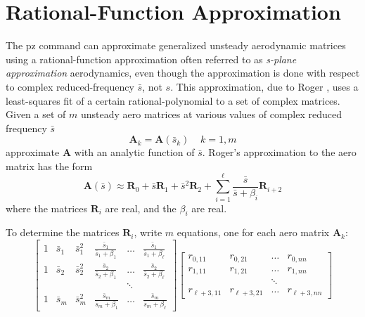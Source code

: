 \documentclass[11pt,openany,twoside]{book}
\numberwithin{equation}{section}		%
\newcommand{\Cmd}[1]{{\sf #1}}
\newcommand{\Newterm}[1]{{\em #1}}	%
\newcommand{\Matrix}[1]{\boldsymbol{#1}}
\begin{document}
\section{Rational-Function Approximation}\label{sect:rfa-theory}
\par
{}
The \Cmd{pz} command can approximate generalized
unsteady aerodynamic matrices using a rational-function
approximation often referred to as \Newterm{s-plane approximation}
aerodynamics, even though the approximation is done
with respect to complex reduced-frequency $\bar{s}$, not $s$.
This approximation, due to Roger \cite{roger1977airplane},
uses a least-squares fit of a certain rational-polynomial
to a set of complex matrices. Given a set of $m$
unsteady aero matrices at various values of complex
reduced frequency $\bar{s}$ 
\begin{equation}
\Matrix{A}_k = \Matrix{A}(\bar{s}_k) \; \; \; \; k = 1, m
\end{equation}
approximate $\Matrix{A}$ with an analytic function of $\bar{s}$.
Roger's approximation to the aero matrix has the form
\begin{equation}
  \Matrix{A}(\bar{s}) \approx \Matrix{R}_0 + \bar{s}\Matrix{R}_1 + \bar{s}^2 \Matrix{R}_2 +  \sum_{i=1}^{\ell} \frac{\bar{s}}{\bar{s} + \beta_i} \Matrix{R}_{i+2}
\end{equation}
where the matrices $\Matrix{R}_i$ are real, and the $\beta_i$ are real.
\par
To determine the matrices $\Matrix{R}_i$, write $m$ equations, one for each
aero matrix $\Matrix{A}_k$:
\begin{displaymath}
\left[
\begin{array}{cccccc}
1 & \bar{s}_1 & \bar{s}_1^2 & \frac{\bar{s}_1}{\bar{s}_1 + \beta_1} & \ldots & \frac{\bar{s}_1}{\bar{s}_1 + \beta_{\ell}} \\
1 & \bar{s}_2 & \bar{s}_2^2 & \frac{\bar{s}_2}{\bar{s}_2 + \beta_1} & \ldots & \frac{\bar{s}_2}{\bar{s}_2 + \beta_{\ell}} \\
  &     &       &                           & \ddots &                           \\
1 & \bar{s}_m & \bar{s}_m^2 & \frac{\bar{s}_m}{\bar{s}_m + \beta_1} & \ldots & \frac{\bar{s}_m}{\bar{s}_m + \beta_{\ell}}
\end{array}
\right]
\left[
\begin{array}{cccc}
r_{0,11}   & r_{0,21}   & \ldots & r_{0,nn} \\
r_{1,11}   & r_{1,21}   & \ldots & r_{1,nn} \\
           &            & \ddots &          \\
r_{\ell+3,11} & r_{\ell+3,21} & \ldots & r_{\ell+3,nn}
\end{array}
\right]
\end{displaymath}
\end{document}
